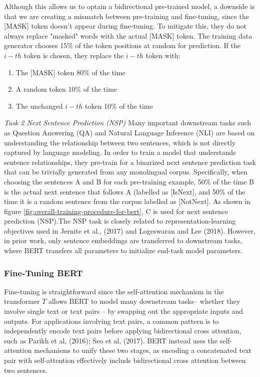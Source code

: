 \documentclass{report}
\begin{document}
Although this allows us to optain a bidirectional pre-trained model, a downside is that we are creating a mismatch between pre-training and fine-tuning, since the [MASK] token doesn't appear during fine-tuning. To mitigate this, they do not always replace "masked" words with the actual [MASK] token. The training data generator chooses 15\% of the token positions at random for prediction. If the $i-th$ token is chosen, they replace the $i-th$ token with:
\begin{enumerate}
	\item The [MASK] token 80\% of the time
	\item A random token 10\% of the time
	\item The unchanged $i-th$ token 10\% of the time
\end{enumerate}

\textit{Task 2 Next Sentence Prediction (NSP)}
Many important downstream tasks such as Question Answering (QA) and Natural Language Inference (NLI) are based on understanding the relationship between two sentences, which is not directly captured by language modeling. In order to train a model that understands sentence relationships, they pre-train for a binarized next sentence prediction task that can be trivially generated from any monolingual corpus. Specifically, when choosing the sentences A and B for each pre-training example, 50\% of the time B is the actual next sentence that follows A (labelled as [IsNext], and 50\% of the time it is a random sentence from the corpus labelled as [NotNext]. As shown in figure \ref{fig:overall-training-procedure-for-bert}, C is used for next sentence prediction (NSP).The NSP task is closely related to representation-learning objectives used in Jernite et al., (2017) and Logeswaran and Lee (2018). However, in prior work, only sentence embeddings are transferred to downstream tasks, where BERT transfers all parameters to initialize end-task model parameters.

\subsubsection{Fine-Tuning BERT}
\label{sssec:fine-tuning-bert}Fine-tuning is straightforward since the self-attention mechanism in the transformer $T$ allows BERT to model many downstream tasks-- whether they involve single text or text pairs -- by swapping out the appropriate inputs and outputs. For applications involving text pairs, a common pattern is to independently encode text pairs before applying bidirectional cross attention, such as Parikh et al, (2016); Seo et al, (2017). BERT instead uses the self-attention mechanisms to unify these two stages, as encoding a concatenated text pair with self-attention effectively includs bidirectional cross attention between two sentences.
\end{document}
